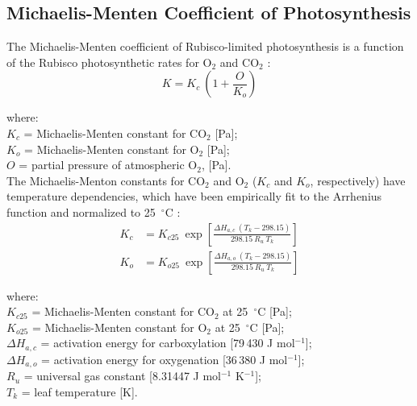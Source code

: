 \subsection{Michaelis-Menten Coefficient of Photosynthesis}
\label{sec:k}
%
The Michaelis-Menten coefficient of Rubisco-limited photosynthesis is a function of the Rubisco photosynthetic rates for O$_2$ and CO$_2$ \parencite{farquhar80}:
\begin{equation}
\label{eq:michaelis}
	K = K_c\: \left( 1 + \frac{O}{K_o} \right)
\end{equation}

\noindent where:\\
\indent $K_c$ = Michaelis-Menten constant for CO$_2$ [Pa];\\
\indent $K_o$ = Michaelis-Menten constant for O$_2$ [Pa];\\
\indent $O$ = partial pressure of atmospheric O$_2$, [Pa].\\

\noindent The Michaelis-Menton constants for CO$_2$ and O$_2$ ($K_c$ and $K_o$, respectively) have temperature dependencies, which have been empirically fit to the Arrhenius function and normalized to 25~$^\circ$C \parencite{farquhar80}:
%
%
\begin{subequations}
\label{eq:kcko}
\begin{align}
	K_c&=K_{c25}\: \exp \left[ 
    	\frac{\Delta H_{a,c}\: \left(T_k-298.15\right)}{298.15\: R_{u}\: T_k}
    \right] \label{eq:kc} \\
    K_o&=K_{o25}\: \exp \left[ 
    	\frac{\Delta H_{a,o}\: \left(T_k-298.15\right)}{298.15\: R_{u}\: T_k}
    \right] \label{eq:ko}
\end{align}
\end{subequations}

\noindent where:\\
\indent $K_{c25}$ = Michaelis-Menten constant for CO$_2$ at 25~$^{\circ}$C [Pa];\\
\indent $K_{o25}$ = Michaelis-Menten constant for O$_2$ at 25~$^{\circ}$C [Pa];\\
\indent $\Delta H_{a,c}$ = activation energy for carboxylation [79$\,$430 J mol$^{-1}$];\\
\indent $\Delta H_{a,o}$ = activation energy for oxygenation [36$\,$380 J mol$^{-1}$];\\
\indent $R_{u}$ = universal gas constant [8.31447 J mol$^{-1}$ K$^{-1}$];\\
\indent $T_k$ = leaf temperature [K].\\

